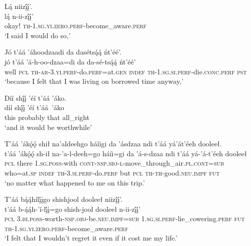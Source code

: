 \ea\label{ex:text7-8-10}
Lą́ niizį́į́’.\\
\gll lą́	n-ii-zį́į́’\\
     okay!	\textsc{th}-1.\textsc{sg}.\textsc{yi}.\textsc{zero}.\textsc{perf}-become\_aware.\textsc{perf}\\
\glt `I said I would do so,'
\z

\ea\label{ex:text7-8-11}
Jó t’áá ’áhoodzaadi da dasétsą́ą́ ńt’éé’.\\
\gll jó	t’áá	’á-h-oo-dzaa=di	da	da-sé-tsą́ą́	ńt’éé’\\
     well	\textsc{pcl}	\textsc{th}-\textsc{ar}-3.\textsc{yi}.\textsc{perf}-do.\textsc{perf}=at.\textsc{gen}	\textsc{indef}	\textsc{th}-1.\textsc{sg}.\textsc{si}.\textsc{perf}-die.\textsc{conc}.\textsc{perf}	\textsc{pst}\\
\glt `because I felt that I was living on borrowed time anyway,'
\z

\ea\label{ex:text7-8-12}
Díí shį́į́ ’éí t’áá ’áko.\\
\gll díí	shį́į́	’éí	t’áá~{’áko}\\
     this	probably	that	all\_right\\
\glt `and it would be worthwhile'
\z

\ea\label{ex:text7-8-13}
T’áá ’ákǫ́ǫ́ shił na’aldeehgo háíigi da ’ásdzaa ndi t’áá yá’át’éeh dooleeł.\\
\gll t’áá	’ákǫ́ǫ́	sh-ił	na-’a-l-deeh=go	háíi=gi	da	’á-s-dzaa	ndi	t’áá	yá-’á-t’éeh	dooleeł\\
     \textsc{pcl}	there	1.\textsc{sg}.\textsc{poss}-with	\textsc{cont}-\textsc{nsp}.\textsc{sbj}-\textsc{l}-move\_through\_air.\textsc{pl}.\textsc{cont}=\textsc{sub}	who=at.\textsc{sp}	\textsc{indef}	\textsc{th}-3.\textsc{si}.\textsc{perf}-do.\textsc{perf}	but	\textsc{pcl}	\textsc{th}-\textsc{th}-good.\textsc{neu}.\textsc{impf}	\textsc{fut}\\
\glt `no matter what happened to me on this trip.'
\z

\ea\label{ex:text7-8-14}
T’áá bą́ą́hílį́įgo shishjool dooleeł niizį́į́’.\\
\gll t’áá	b-ą́ą́h-’í-lį́į=go	shish-jool	dooleeł	n-ii-zį́į́’\\
     \textsc{pcl}	3.\textsc{bi}.\textsc{poss}-worth-\textsc{nsp}.\textsc{obj}-be.\textsc{neu}.\textsc{impf}=\textsc{sub}	1.\textsc{sg}.\textsc{si}.\textsc{perf}-lie\_cowering.\textsc{perf}	\textsc{fut}	\textsc{th}-1.\textsc{sg}.\textsc{yi}.\textsc{zero}.\textsc{perf}-become\_aware.\textsc{perf}\\
\glt `I felt that I wouldn't regret it even if it cost me my life.'
\z

